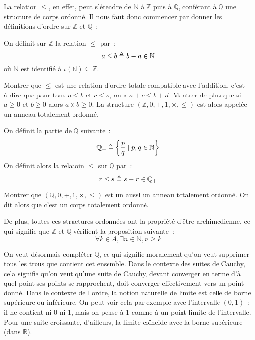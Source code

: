 La relation $\leq$, en effet, peut s'étendre de $\mathbb N$ à $\mathbb Z$ puis
à $\mathbb Q$, conférant à $\mathbb Q$ une structure de corps ordonné. Il nous
faut donc commencer par donner les définitions d'ordre sur $\mathbb Z$ et
$\mathbb Q$~:

\begin{definition}
  On définit sur $\mathbb Z$ la relation $\leq$ par~:
  \[a \leq b \triangleq b - a \in \mathbb N\]
  où $\mathbb N$ est identifié à $\iota(\mathbb N) \subseteq \mathbb Z$.
\end{definition}

\begin{exercise}
  Montrer que $\leq$ est une relation d'ordre totale compatible avec l'addition,
  c'est-à-dire que pour tous $a\leq b$ et $c\leq d$, on a $a+c\leq b+d$.
  Montrer de plus que si $a \geq 0$ et $b\geq 0$ alors $a\times b \geq 0$.
  La structure $(\mathbb Z,0,+,1,\times,\leq)$ est alors appelée un anneau
  totalement ordonné.
\end{exercise}

\begin{definition}
  On définit la partie de $\mathbb Q$ suivante~:
  \[\mathbb Q_+ \triangleq \left\{\frac{p}{q}\mid p,q\in \mathbb N\right\}\]
  On définit alors la relatoin $\leq$ sur $\mathbb Q$ par~:
  \[r \leq s \triangleq s - r \in \mathbb Q_+\]
\end{definition}

\begin{exercise}
  Montrer que $(\mathbb Q,0,+,1,\times,\leq)$ est un aussi un anneau totalement
  ordonné. On dit alors que c'est un corps totalement ordonné.
\end{exercise}

De plus, toutes ces structures ordonnées ont la propriété d'être archimédienne,
ce qui signifie que $\mathbb Z$ et $\mathbb Q$ vérifient la proposition
suivante~:
\[\forall k\in A, \exists n \in\mathbb N, n \geq k\]

On veut désormais compléter $\mathbb Q$, ce qui signifie moralement qu'on veut
supprimer tous les trous que contient cet ensemble. Dans le contexte des suites
de Cauchy, cela signifie qu'on veut qu'une suite de Cauchy, devant converger en
terme d'à quel point ses points se rapprochent, doit converger effectivement
vers un point donné. Dans le contexte de l'ordre, la notion naturelle de limite
est celle de borne supérieure ou inférieure. On peut voir cela par exemple avec
l'intervalle $(0,1)$~: il ne contient ni $0$ ni $1$, mais on pense à $1$ comme à
un point limite de l'intervalle. Pour une suite croissante, d'ailleurs, la
limite coïncide avec la borne supérieure (dans $\mathbb R$).

